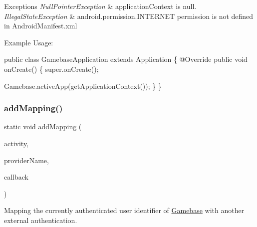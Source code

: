 \begin{DoxyExceptions}{Exceptions}
{\em Null\+Pointer\+Exception} & \textquotesingle{}application\+Context\textquotesingle{} is null. \\
\hline
{\em Illegal\+State\+Exception} & \textquotesingle{}android.\+permission.\+I\+N\+T\+E\+R\+N\+ET\textquotesingle{} permission is not defined in Android\+Manifest.\+xml\\
\hline
\end{DoxyExceptions}
Example Usage\+: 
\begin{DoxyCode}
\textcolor{keyword}{public} \textcolor{keyword}{class }GamebaseApplication \textcolor{keyword}{extends} Application \{
    @Override
    \textcolor{keyword}{public} \textcolor{keywordtype}{void} onCreate() \{
        super.onCreate();

        Gamebase.activeApp(getApplicationContext());
    \}
\}
\end{DoxyCode}
 \mbox{\label{classcom_1_1toast_1_1android_1_1gamebase_1_1_gamebase_ab860dbc75a62b009d67eca25247493f1}} 
\subsubsection{\texorpdfstring{add\+Mapping()}{addMapping()}\hspace{0.1cm}{\footnotesize\ttfamily [1/3]}}
{\footnotesize\ttfamily static void add\+Mapping (\begin{DoxyParamCaption}\item[{@Non\+Null final Activity}]{activity,  }\item[{@Non\+Null final String}]{provider\+Name,  }\item[{@Nullable final \hyperlink{interfacecom_1_1toast_1_1android_1_1gamebase_1_1_gamebase_data_callback}{Gamebase\+Data\+Callback}$<$ \hyperlink{classcom_1_1toast_1_1android_1_1gamebase_1_1auth_1_1data_1_1_auth_token}{Auth\+Token} $>$}]{callback }\end{DoxyParamCaption})\hspace{0.3cm}{\ttfamily [static]}}



Mapping the currently authenticated user identifier of \hyperlink{classcom_1_1toast_1_1android_1_1gamebase_1_1_gamebase}{Gamebase} with another external authentication. 

